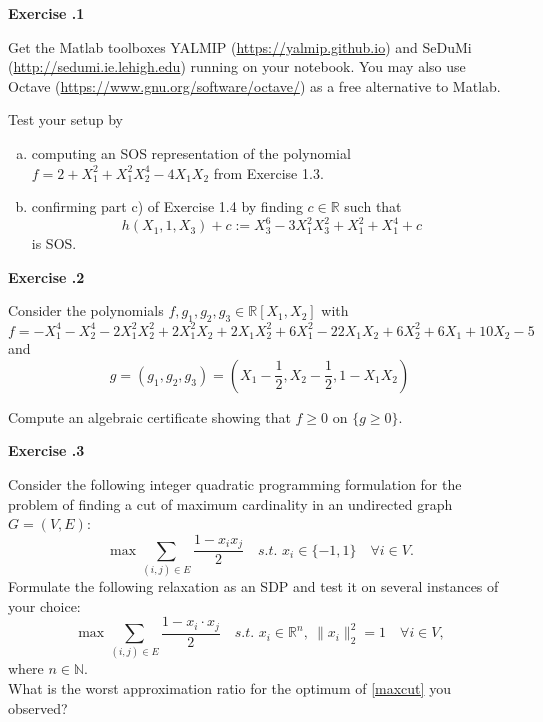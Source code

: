 \documentclass{imo_en}
\newcommand{\R}{\mathbb{R}}
\newcommand{\N}{\mathbb{N}}
\newcommand{\set}[1]{\{#1\}}
\begin{document}
\maketitle


{\large \textbf{Exercise \thesheetnumber .1}} \bigskip 

Get the Matlab toolboxes YALMIP (\url{https://yalmip.github.io}) and SeDuMi (\url{http://sedumi.ie.lehigh.edu}) running on your notebook. You may also use Octave (\url{https://www.gnu.org/software/octave/}) as a free alternative to Matlab.

\vspace{0.5\baselineskip}
Test your setup by
\begin{enumerate}[a)]
	\item computing an SOS representation of the polynomial $f = 2 + X_1^2 + X_1^2 X_2^4 - 4X_1 X_2$ from Exercise 1.3.
	\item confirming part c) of Exercise 1.4 by finding $c \in \R$ such that $$h(X_1, 1, X_3) + c:= X_3^6 - 3X_1^2 X_3^2 + X_1^2 + X_1^4 +c$$ is SOS.
\end{enumerate} 

\bigskip


{\large \textbf{Exercise \thesheetnumber .2}} \bigskip

Consider the polynomials $f, g_1, g_2, g_3 \in \R[X_1,X_2]$ with
$$f=-X_1^4 - X_2^4 - 2 X_1^2 X_2^2 + 2 X_1^2 X_2 + 2 X_1 X_2^2 + 6 X_1^2 - 22 X_1 X_2 + 6 X_2^2 + 6 X_1 + 10 X_2 - 5 $$  
and $$g=(g_1, g_2, g_3)=(X_1-\frac{1}{2}, X_2-\frac{1}{2}, 1 - X_1 X_2)$$

Compute an algebraic certificate showing that $f \geq 0$ on $\set{g \geq 0}$.

\bigskip


{\large \textbf{Exercise \thesheetnumber .3}} \bigskip 

Consider the following integer quadratic programming formulation for the problem of finding a cut of maximum cardinality in an undirected graph $G=(V,E)$:
\begin{equation}
\max \sum_{(i,j) \in E} \frac{1 - x_i x_j}{2} \quad \textit{s.t. } x_i \in \set{-1,1} \quad \forall i \in V. \label{maxcut} \tag{MAXCUT}
\end{equation}
Formulate the following relaxation as an SDP and test it on several instances of your choice:
$$\max \sum_{(i,j) \in E} \frac{1 - x_i \cdot x_j}{2} \quad \textit{s.t. } x_i \in \R^n,~\|x_i\|_2^2 = 1 \quad \forall i \in V,$$
where $n \in \N$. \\
What is the worst approximation ratio for the optimum of \eqref{maxcut} you observed?
\end{document}
